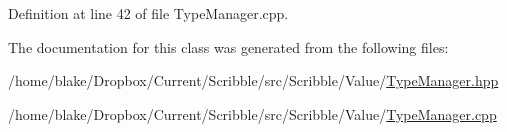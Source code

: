 Definition at line 42 of file Type\-Manager.\-cpp.



The documentation for this class was generated from the following files\-:\begin{DoxyCompactItemize}
\item 
/home/blake/\-Dropbox/\-Current/\-Scribble/src/\-Scribble/\-Value/\hyperlink{_type_manager_8hpp}{Type\-Manager.\-hpp}\item 
/home/blake/\-Dropbox/\-Current/\-Scribble/src/\-Scribble/\-Value/\hyperlink{_type_manager_8cpp}{Type\-Manager.\-cpp}\end{DoxyCompactItemize}

